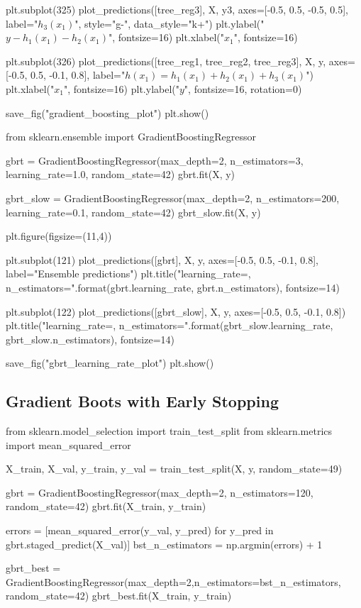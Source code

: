 \documentclass[%
oneside,                 %
final,                   %
10pt]{article}
\begin{document}
plt.subplot(325)
plot_predictions([tree_reg3], X, y3, axes=[-0.5, 0.5, -0.5, 0.5], label="$h_3(x_1)$", style="g-", data_style="k+")
plt.ylabel("$y - h_1(x_1) - h_2(x_1)$", fontsize=16)
plt.xlabel("$x_1$", fontsize=16)

plt.subplot(326)
plot_predictions([tree_reg1, tree_reg2, tree_reg3], X, y, axes=[-0.5, 0.5, -0.1, 0.8], label="$h(x_1) = h_1(x_1) + h_2(x_1) + h_3(x_1)$")
plt.xlabel("$x_1$", fontsize=16)
plt.ylabel("$y$", fontsize=16, rotation=0)

save_fig("gradient_boosting_plot")
plt.show()

from sklearn.ensemble import GradientBoostingRegressor

gbrt = GradientBoostingRegressor(max_depth=2, n_estimators=3, learning_rate=1.0, random_state=42)
gbrt.fit(X, y)

gbrt_slow = GradientBoostingRegressor(max_depth=2, n_estimators=200, learning_rate=0.1, random_state=42)
gbrt_slow.fit(X, y)

plt.figure(figsize=(11,4))

plt.subplot(121)
plot_predictions([gbrt], X, y, axes=[-0.5, 0.5, -0.1, 0.8], label="Ensemble predictions")
plt.title("learning_rate={}, n_estimators={}".format(gbrt.learning_rate, gbrt.n_estimators), fontsize=14)

plt.subplot(122)
plot_predictions([gbrt_slow], X, y, axes=[-0.5, 0.5, -0.1, 0.8])
plt.title("learning_rate={}, n_estimators={}".format(gbrt_slow.learning_rate, gbrt_slow.n_estimators), fontsize=14)

save_fig("gbrt_learning_rate_plot")
plt.show()

\epycod


\subsection{Gradient Boots with Early Stopping}
\bpycod

from sklearn.model_selection import train_test_split
from sklearn.metrics import mean_squared_error

X_train, X_val, y_train, y_val = train_test_split(X, y, random_state=49)

gbrt = GradientBoostingRegressor(max_depth=2, n_estimators=120, random_state=42)
gbrt.fit(X_train, y_train)

errors = [mean_squared_error(y_val, y_pred)
          for y_pred in gbrt.staged_predict(X_val)]
bst_n_estimators = np.argmin(errors) + 1

gbrt_best = GradientBoostingRegressor(max_depth=2,n_estimators=bst_n_estimators, random_state=42)
gbrt_best.fit(X_train, y_train)
\end{document}
